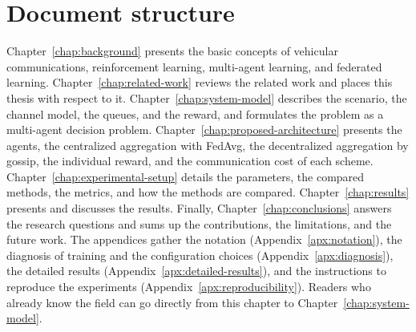 \section{Document structure}
\label{sec:intro-structure}

Chapter~\ref{chap:background} presents the basic concepts of vehicular communications, reinforcement
learning, multi-agent learning, and federated learning. Chapter~\ref{chap:related-work} reviews the related
work and places this thesis with respect to it. Chapter~\ref{chap:system-model} describes the scenario, the
channel model, the queues, and the reward, and formulates the problem as a multi-agent decision problem.
Chapter~\ref{chap:proposed-architecture} presents the agents, the centralized aggregation with \ac{FedAvg},
the decentralized aggregation by gossip, the individual reward, and the communication cost of each scheme.
Chapter~\ref{chap:experimental-setup} details the parameters, the compared methods, the metrics, and how the
methods are compared. Chapter~\ref{chap:results} presents and discusses the results. Finally,
Chapter~\ref{chap:conclusions} answers the research questions and sums up the contributions, the
limitations, and the future work. The appendices gather the notation (Appendix~\ref{apx:notation}), the
diagnosis of training and the configuration choices (Appendix~\ref{apx:diagnosis}), the detailed results
(Appendix~\ref{apx:detailed-results}), and the instructions to reproduce the experiments
(Appendix~\ref{apx:reproducibility}). Readers who already know the field can go directly from this chapter
to Chapter~\ref{chap:system-model}.
